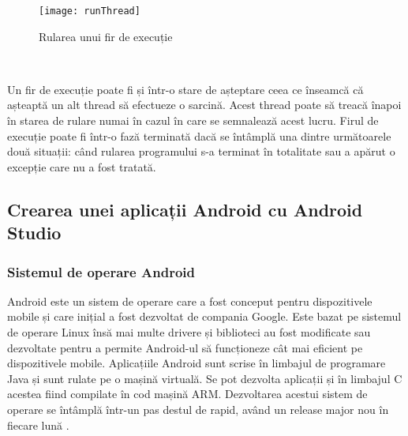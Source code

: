 \documentclass[../IoMusT.tex]{subfiles}
\begin{document}
\begin{figure}[h]
\centering
\texttt{[image: runThread]}
\caption{Rularea unui fir de execuție}
\label{fig:runthread}
\end{figure}
\\
\par Un fir de execuție poate fi și într-o stare de așteptare ceea ce înseamcă că așteaptă un alt thread să efectueze o sarcină. Acest thread poate să treacă înapoi în starea de rulare numai în cazul în care se semnalează acest lucru. Firul de execuție poate fi într-o fază terminată dacă se întâmplă una dintre următoarele două situații: când rularea programului s-a terminat  în totalitate sau a apărut o excepție care nu a fost tratată.

\subsection{Crearea unei aplicații Android cu Android Studio}
\subsubsection{Sistemul de operare Android}
Android este un sistem de operare care a fost conceput pentru dispozitivele mobile și care inițial a fost dezvoltat de compania Google. Este bazat pe sistemul de operare Linux însă mai multe drivere și biblioteci  au fost mo\-di\-fi\-ca\-te sau dezvoltate pentru a permite Android-ul să funcționeze cât mai eficient pe dispozitivele mobile. Aplicațiile Android sunt scrise în limbajul de programare Java și sunt rulate pe o mașină virtuală. Se pot dezvolta aplicații și în limbajul C acestea fiind compilate în cod mașină ARM. Dezvoltarea acestui sistem de operare se întâmplă într-un pas destul de rapid, având un release major nou în fiecare lună  \cite{Android}.	
\end{document}
